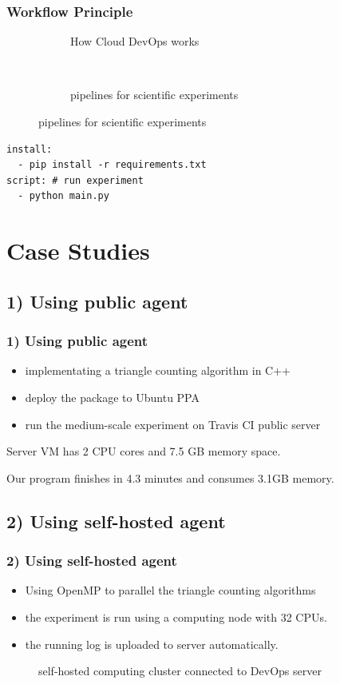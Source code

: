 \documentclass[notheorems]{beamer}
\begin{document}
\begin{frame}[fragile]
\frametitle{Workflow Principle}
\begin{figure}
\centering
\begin{subfigure}{0.4\textwidth}
\caption{How Cloud DevOps works}
\end{subfigure}~
\begin{subfigure}{0.4\textwidth}
\caption{pipelines for scientific experiments}
\end{subfigure}
\end{figure}

\begin{lstlisting}[caption={workflow description}, label={lst:wd}, captionpos=b, xleftmargin=.25\textwidth]
install: 
  - pip install -r requirements.txt
script: # run experiment
  - python main.py
\end{lstlisting}

\end{frame}
\section{Case Studies}
\frame{\tableofcontents[currentsection]}
\subsection{1) Using public agent}
\begin{frame}
\frametitle{1) Using public agent}
\begin{itemize}
\item implementating a triangle counting algorithm in C++
\item deploy the package to Ubuntu PPA
\item run the medium-scale experiment on Travis CI public server
\end{itemize}
Server VM has 2 CPU cores and 7.5 GB memory space.

Our program finishes in 4.3 minutes and consumes 3.1GB memory.
\end{frame}
\subsection{2) Using self-hosted agent}
\begin{frame}
\frametitle{2) Using self-hosted agent}
\begin{itemize}
\item Using OpenMP to parallel the triangle counting algorithms
\item the experiment is run using a computing node with 32 CPUs.
\item the running log is uploaded to server automatically.
\end{itemize}
\begin{figure}
\caption{self-hosted computing cluster connected to DevOps server}
\end{figure}
\end{frame}
\end{document}
